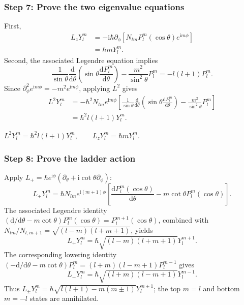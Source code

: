 \documentclass[11pt,a4paper]{article}
\newcommand{\key}[1]{\begin{resultbox}\centering\(\displaystyle #1\)\end{resultbox}}
\newcommand{\dd}{\mathrm{d}}
\newcommand{\iu}{\mathrm{i}}
\newcommand{\p}{\partial}
\begin{document}
\subsubsection*{Step 7: Prove the two eigenvalue equations}
First,
\begin{align}
L_zY_l^m&=-\iu\hbar\p_\phi[N_{lm}P_l^m(\cos\theta)e^{\iu m\phi}]\\
&=\hbar mY_l^m.
\end{align}
Second, the associated Legendre equation implies
\begin{equation}\frac1{\sin\theta}\frac{\dd}{\dd\theta}\left(\sin\theta\frac{\dd P_l^m}{\dd\theta}\right)-\frac{m^2}{\sin^2\theta}P_l^m=-l(l+1)P_l^m.\end{equation}
Since \(\p_\phi^2e^{\iu m\phi}=-m^2e^{\iu m\phi}\), applying \(L^2\) gives
\begin{align}
L^2Y_l^m&=-\hbar^2N_{lm}e^{\iu m\phi}\left[\frac1{\sin\theta}\frac{\dd}{\dd\theta}(\sin\theta\frac{\dd P_l^m}{\dd\theta})-\frac{m^2}{\sin^2\theta}P_l^m\right]\\
&=\hbar^2l(l+1)Y_l^m.
\end{align}
\key{\boxed{L^2Y_l^m=\hbar^2l(l+1)Y_l^m,\qquad L_zY_l^m=\hbar mY_l^m.}}

\subsubsection*{Step 8: Prove the ladder action}
Apply \(L_+=\hbar e^{\iu\phi}(\p_\theta+\iu\cot\theta\p_\phi)\):
\begin{equation}L_+Y_l^m=\hbar N_{lm}e^{\iu(m+1)\phi}\left[\frac{\dd P_l^m(\cos\theta)}{\dd\theta}-m\cot\theta P_l^m(\cos\theta)\right].\end{equation}
The associated Legendre identity \((\dd/\dd\theta-m\cot\theta)P_l^m(\cos\theta)=P_l^{m+1}(\cos\theta)\), combined with \(N_{lm}/N_{l,m+1}=\sqrt{(l-m)(l+m+1)}\), yields
\begin{equation}\boxed{L_+Y_l^m=\hbar\sqrt{(l-m)(l+m+1)}Y_l^{m+1}.}\end{equation}
The corresponding lowering identity \((-\dd/\dd\theta-m\cot\theta)P_l^m=(l+m)(l-m+1)P_l^{m-1}\) gives
\begin{equation}\boxed{L_-Y_l^m=\hbar\sqrt{(l+m)(l-m+1)}Y_l^{m-1}.}\end{equation}
Thus \(L_\pm Y_l^m=\hbar\sqrt{l(l+1)-m(m\pm1)}Y_l^{m\pm1}\); the top \(m=l\) and bottom \(m=-l\) states are annihilated.
\end{document}
